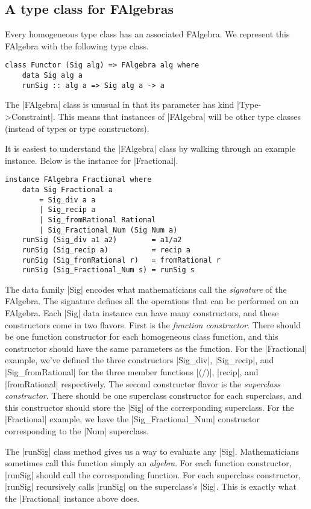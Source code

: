 \documentclass[preprint]{sigplanconf}
\theoremstyle{definition}
\begin{document}
\subsection{A type class for FAlgebras}
Every homogeneous type class has an associated FAlgebra.
We represent this FAlgebra with the following type class.
\begin{lstlisting}
class Functor (Sig alg) => FAlgebra alg where
    data Sig alg a
    runSig :: alg a => Sig alg a -> a
\end{lstlisting}
The |FAlgebra| class is unusual in that its parameter has kind |Type->Constraint|.
This means that instances of |FAlgebra| will be other type classes
(instead of types or type constructors).

It is easiest to understand the |FAlgebra| class by walking through an example instance.
Below is the instance for |Fractional|.
\begin{lstlisting}
instance FAlgebra Fractional where
    data Sig Fractional a
        = Sig_div a a
        | Sig_recip a
        | Sig_fromRational Rational
        | Sig_Fractional_Num (Sig Num a)
    runSig (Sig_div a1 a2)        = a1/a2
    runSig (Sig_recip a)          = recip a
    runSig (Sig_fromRational r)   = fromRational r
    runSig (Sig_Fractional_Num s) = runSig s
\end{lstlisting}

The data family |Sig| encodes what mathematicians call the \emph{signature} of the FAlgebra.
The signature defines all the operations that can be performed on an FAlgebra.
Each |Sig| data instance can have many constructors,
and these constructors come in two flavors.
First is the \emph{function constructor}.
There should be one function constructor for each homogeneous class function, and
this constructor should have the same parameters as the function.
For the |Fractional| example, we've defined the three constructors |Sig_div|, |Sig_recip|, and |Sig_fromRational| for the three member functions |(/)|, |recip|, and |fromRational| respectively.
The second constructor flavor is the \emph{superclass constructor}.
There should be one superclass constructor for each superclass, and
this constructor should store the |Sig| of the corresponding superclass.
For the |Fractional| example, we have the |Sig_Fractional_Num| constructor corresponding to the |Num| superclass.

The |runSig| class method gives us a way to evaluate any |Sig|.
Mathematicians sometimes call this function simply an \emph{algebra}.
For each function constructor, |runSig| should call the corresponding function.
For each superclass constructor, |runSig| recursively calls |runSig| on the superclass's |Sig|.
This is exactly what the |Fractional| instance above does.
\end{document}
